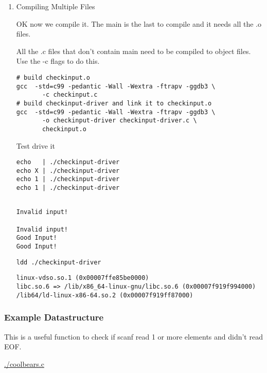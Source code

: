 \documentclass[11pt]{article}
\begin{document}
\begin{enumerate}
\item Compiling Multiple Files
\label{sec:org2f354ab}

OK now we compile it. The main is the last to compile and it needs all the .o files.

All the .c files that don't contain main need to be compiled to object
files. Use the -c flags to do this.

\begin{verbatim}
# build checkinput.o
gcc  -std=c99 -pedantic -Wall -Wextra -ftrapv -ggdb3 \
       -c checkinput.c
# build checkinput-driver and link it to checkinput.o
gcc  -std=c99 -pedantic -Wall -Wextra -ftrapv -ggdb3 \
       -o checkinput-driver checkinput-driver.c \
       checkinput.o
\end{verbatim}

Test drive it

\begin{verbatim}
echo   | ./checkinput-driver
echo X | ./checkinput-driver
echo 1 | ./checkinput-driver
echo 1 | ./checkinput-driver
\end{verbatim}

\begin{verbatim}

Invalid input!

Invalid input!
Good Input!
Good Input!
\end{verbatim}


\begin{verbatim}
ldd ./checkinput-driver
\end{verbatim}

\begin{verbatim}
linux-vdso.so.1 (0x00007ffe85be0000)
libc.so.6 => /lib/x86_64-linux-gnu/libc.so.6 (0x00007f919f994000)
/lib64/ld-linux-x86-64.so.2 (0x00007f919ff87000)
\end{verbatim}
\end{enumerate}

\subsubsection{Example Datastructure}
\label{sec:org566a4ef}

This is a useful function to check if scanf read 1 or more elements
and didn't read EOF.

\url{./coolbears.c}
\end{document}
